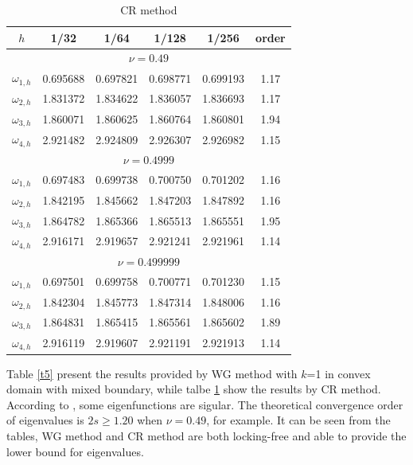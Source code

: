 \documentclass[leqno,CJK]{siamltex704}
\numberwithin{equation}{section}
\begin{document}
\begin{table}[H]
	\begin{center}
		\caption{CR method}\label{t6}
		\begin{tabular}{|c|c|c|c|c|c|}\hline
			$h$&1/32&1/64&1/128&1/256&order\\ \hline\hline
			\multicolumn{6}{|c|}{$\nu=0.49$}\\ \hline
			$\omega_{1,h}$&0.695688 & 0.697821 & 0.698771 & 0.699193 & 1.17 \\ \hline
			$\omega_{2,h}$&1.831372 & 1.834622 & 1.836057 & 1.836693 & 1.17 \\ \hline
			$\omega_{3,h}$&1.860071 & 1.860625 & 1.860764 & 1.860801 & 1.94 \\ \hline
			$\omega_{4,h}$&2.921482 & 2.924809 & 2.926307 & 2.926982 & 1.15 \\ \hline
		\multicolumn{6}{|c|}{$\nu=0.4999$}\\ \hline
			$\omega_{1,h}$&0.697483 & 0.699738 & 0.700750 & 0.701202 & 1.16 \\ \hline
			$\omega_{2,h}$&1.842195 & 1.845662 & 1.847203 & 1.847892 & 1.16 \\ \hline
			$\omega_{3,h}$&1.864782 & 1.865366 & 1.865513 & 1.865551 & 1.95 \\ \hline
			$\omega_{4,h}$&2.916171 & 2.919657 & 2.921241 & 2.921961 & 1.14 \\ \hline
		\multicolumn{6}{|c|}{$\nu=0.499999$}\\ \hline
			$\omega_{1,h}$&0.697501 & 0.699758 & 0.700771 & 0.701230 & 1.15 \\ \hline
			$\omega_{2,h}$&1.842304 & 1.845773 & 1.847314 & 1.848006 & 1.16 \\ \hline
			$\omega_{3,h}$&1.864831 & 1.865415 & 1.865561 & 1.865602 & 1.89 \\ \hline
			$\omega_{4,h}$&2.916119 & 2.919607 & 2.921191 & 2.921913 & 1.14 \\ \hline
		\end{tabular}
	\end{center}
\end{table}

Table \ref{t5} present the results provided by WG method with $k$=1 in convex domain with mixed boundary, while talbe \ref{t6} show the results by CR method. According to \cite{Meddahi2013}, some eigenfunctions are sigular. The theoretical convergence order of eigenvalues is $2s\ge1.20$ when $\nu=0.49$, for example. It can be seen from the tables, WG method and CR method are both  locking-free and able to provide the lower bound for eigenvalues.
	
\end{document}
